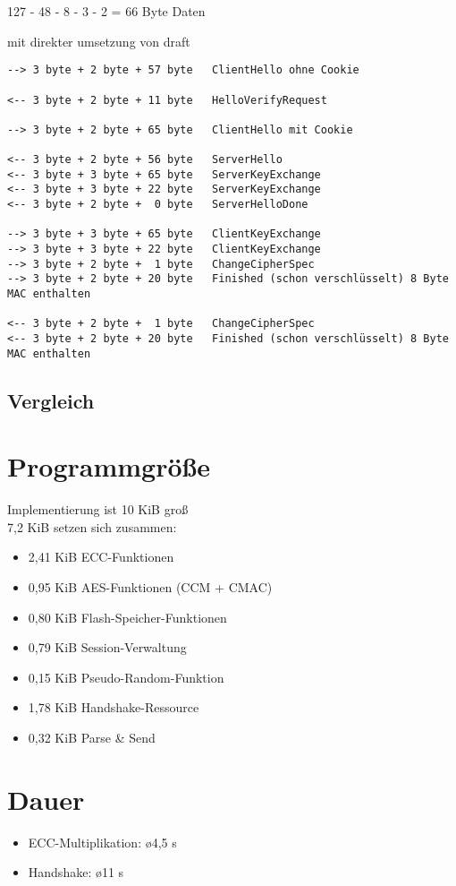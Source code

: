 127 - 48 - 8 - 3 - 2 = 66 Byte Daten

mit direkter umsetzung von draft \cite[Kapitel 3]{draftcodtls}

\begin{verbatim}
--> 3 byte + 2 byte + 57 byte   ClientHello ohne Cookie

<-- 3 byte + 2 byte + 11 byte   HelloVerifyRequest

--> 3 byte + 2 byte + 65 byte   ClientHello mit Cookie

<-- 3 byte + 2 byte + 56 byte   ServerHello
<-- 3 byte + 3 byte + 65 byte   ServerKeyExchange
<-- 3 byte + 3 byte + 22 byte   ServerKeyExchange
<-- 3 byte + 2 byte +  0 byte   ServerHelloDone

--> 3 byte + 3 byte + 65 byte   ClientKeyExchange
--> 3 byte + 3 byte + 22 byte   ClientKeyExchange
--> 3 byte + 2 byte +  1 byte   ChangeCipherSpec
--> 3 byte + 2 byte + 20 byte   Finished (schon verschlüsselt) 8 Byte MAC enthalten

<-- 3 byte + 2 byte +  1 byte   ChangeCipherSpec
<-- 3 byte + 2 byte + 20 byte   Finished (schon verschlüsselt) 8 Byte MAC enthalten
 \end{verbatim}

\subsection{Vergleich}

\section{Programmgröße}

Implementierung ist 10 KiB groß\\
7,2 KiB setzen sich zusammen: 
\begin{itemize}
  \item 2,41 KiB ECC-Funktionen
  \item 0,95 KiB AES-Funktionen (CCM + CMAC)
  \item 0,80 KiB Flash-Speicher-Funktionen
  \item 0,79 KiB Session-Verwaltung
  \item 0,15 KiB Pseudo-Random-Funktion
  \item 1,78 KiB Handshake-Ressource
  \item 0,32 KiB Parse \& Send
\end{itemize}

\section{Dauer}

\begin{itemize}
  \item ECC-Multiplikation: \o 4,5 s
  \item Handshake: \o 11 s
\end{itemize}